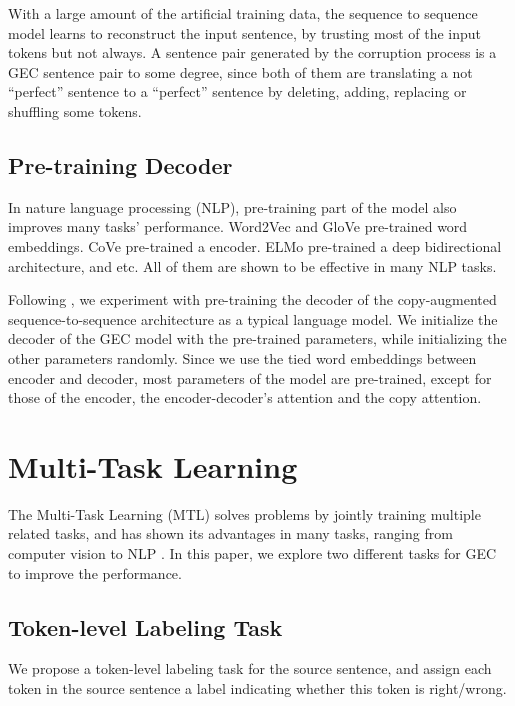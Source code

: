 \documentclass[11pt,a4paper]{article}
\begin{document}
With a large amount of the artificial training data, the sequence to sequence model learns to reconstruct the input sentence, by trusting most of the input tokens but not always. A sentence pair generated by the corruption process is a GEC sentence pair to some degree, since both of them are translating a not ``perfect'' sentence to a ``perfect'' sentence by deleting, adding, replacing or shuffling some tokens.


\subsection{Pre-training Decoder}
In nature language processing (NLP), pre-training part of the model also improves many tasks' performance. Word2Vec and GloVe \cite{pennington2014glove,mikolov2013distributed} pre-trained word embeddings. CoVe \cite{mccann2017learned} pre-trained a encoder. ELMo \cite{peters2018deep} pre-trained a deep bidirectional architecture, and etc. All of them are shown to be effective in many NLP tasks.

Following \cite{ramachandran2016unsupervised,junczys2018approaching}, we experiment with pre-training the decoder of the copy-augmented sequence-to-sequence architecture as a typical language model. We initialize the decoder of the GEC model with the pre-trained parameters, while initializing the other parameters randomly. Since we use the tied word embeddings between encoder and decoder, most parameters of the model are pre-trained, except for those of the encoder, the encoder-decoder's attention and the copy attention.


\section{Multi-Task Learning}

The Multi-Task Learning (MTL) solves problems by jointly training multiple related tasks, and has shown its advantages in many tasks, ranging from computer vision \cite{zhang2014facial,dai2016instance} to NLP \cite{collobert2008unified,sogaard2016deep}. In this paper, we explore two different tasks for GEC to improve the performance.


\subsection{Token-level Labeling Task}
We propose a token-level labeling task for the source sentence, and assign each token in the source sentence a label indicating whether this token is right/wrong. 
\end{document}
